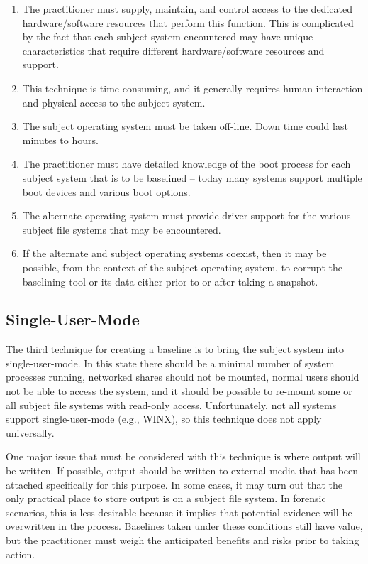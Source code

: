 \documentclass[10pt]{article}
\begin{document}
\begin{enumerate}

  \item
  The practitioner must supply, maintain, and control access to the
  dedicated hardware/software resources that perform this function.
  This is complicated by the fact that each subject system encountered
  may have unique characteristics that require different
  hardware/software resources and support.

  \item
  This technique is time consuming, and it generally requires human
  interaction and physical access to the subject system.

  \item
  The subject operating system must be taken off-line.  Down time
  could last minutes to hours.

  \item
  The practitioner must have detailed knowledge of the boot process
  for each subject system that is to be baselined -- today many
  systems support multiple boot devices and various boot options.

  \item
  The alternate operating system must provide driver support for the
  various subject file systems that may be encountered.

  \item
  If the alternate and subject operating systems coexist, then it may
  be possible, from the context of the subject operating system, to
  corrupt the baselining tool or its data either prior to or after
  taking a snapshot.

\end{enumerate}

\subsection{Single-User-Mode}

The third technique for creating a baseline is to bring the subject
system into single-user-mode.  In this state there should be a minimal
number of system processes running, networked shares should not be
mounted, normal users should not be able to access the system, and it
should be possible to re-mount some or all subject file systems with
read-only access.  Unfortunately, not all systems support
single-user-mode (e.g., WINX), so this technique does not apply
universally.

One major issue that must be considered with this technique is where
output will be written.  If possible, output should be written to
external media that has been attached specifically for this purpose.
In some cases, it may turn out that the only practical place to store
output is on a subject file system.  In forensic scenarios, this is
less desirable because it implies that potential evidence will be
overwritten in the process.  Baselines taken under these conditions
still have value, but the practitioner must weigh the anticipated
benefits and risks prior to taking action.
\end{document}
